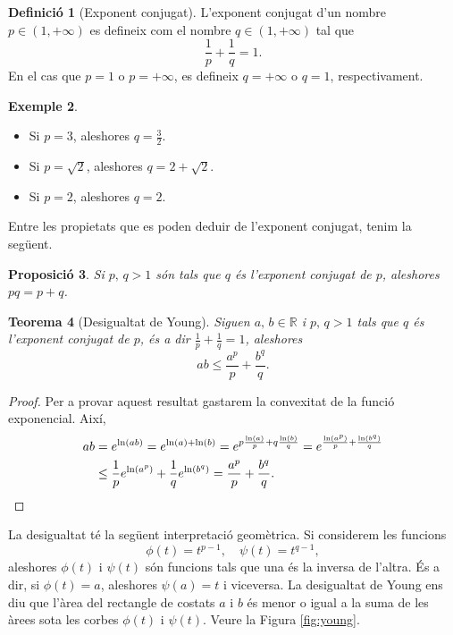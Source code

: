 \documentclass[12pt]{book}
\newtheorem{teorema}{Teorema}[chapter]
\newtheorem{prop}[teorema]{Proposició}
\theoremstyle{definition}
\newtheorem{defi}[teorema]{Definició}
\theoremstyle{nota}
\theoremstyle{exemple}
\newtheorem{exemple}[teorema]{Exemple}
\begin{document}
\begin{defi}[Exponent conjugat]
  L'exponent conjugat d'un nombre $p \in (1, +\infty)$ es defineix com
  el nombre $q \in (1, +\infty)$ tal que
  \[
    \frac{1}{p} + \frac{1}{q} = 1.
  \]
  En el cas que $p = 1$ o $p = +\infty$, es defineix $q = +\infty$ o
  $q = 1$, respectivament.
\end{defi}

\begin{exemple}
  \begin{itemize}[nosep]
  \item Si $p=3$, aleshores $q = \frac{3}{2}$.
  \item Si $p = \sqrt{2}$, aleshores $q = 2 + \sqrt{2}$.
  \item Si $p = 2$, aleshores $q = 2$.
  \end{itemize}
\end{exemple}

Entre les propietats que es poden deduir de l'exponent conjugat, tenim
la següent.

\begin{prop}
  Si $p,\, q > 1$ són tals que $q$ és l'exponent conjugat de $p$,
  aleshores $pq = p + q$.
\end{prop}

\begin{teorema}[Desigualtat de Young]
  Siguen $a,\, b \in \mathbb{R}$ i $p,\, q > 1$ tals que $q$ és
  l'exponent conjugat de $p$, és a dir
  $\frac{1}{p} + \frac{1}{q} = 1$, aleshores
  \[
    ab \leq \frac{a^p}{p} + \frac{b^q}{q}.
  \]
\end{teorema}

\begin{proof}
  Per a provar aquest resultat gastarem la convexitat de la funció
  exponencial. Així,
  \begin{align*}
    ab &= e^{\ln(ab)} = e^{\ln(a) + \ln(b)}
         = e^{p \frac{\ln(a)}{p} + q \frac{\ln(b)}{q}}
         = e^{\frac{\ln(a^p)}{p}+\frac{\ln(b^q)}{q}} \\
       &\leq \frac{1}{p} e^{\ln(a^p)} + \frac{1}{q} e^{\ln(b^q)}
         = \frac{a^p}{p} + \frac{b^q}{q}.\qedhere
  \end{align*}
\end{proof}

La desigualtat té la següent interpretació geomètrica. Si considerem
les funcions
\[
  \phi(t) = t^{p-1}, \quad \psi(t) = t^{q-1},
\]
aleshores $\phi(t)$ i $\psi(t)$ són funcions tals que una és la
inversa de l'altra. És a dir, si $\phi(t) = a$, aleshores
$\psi(a) = t$ i viceversa. La desigualtat de Young ens diu que l'àrea
del rectangle de costats $a$ i $b$ és menor o igual a la suma de les
àrees sota les corbes $\phi(t)$ i $\psi(t)$. Veure la Figura
\ref{fig:young}.
\end{document}
